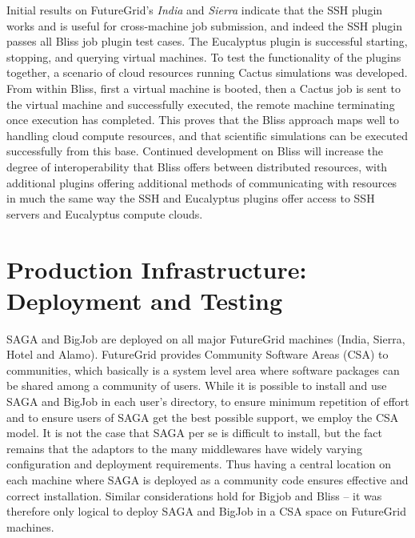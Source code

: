 \documentclass[]{paper}
\begin{document}
Initial results on FutureGrid's \textit{India} and \textit{Sierra} indicate that the
SSH plugin works and is useful for cross-machine
job submission, and indeed the SSH plugin passes all Bliss job plugin test cases.
The Eucalyptus plugin is successful starting, stopping, and querying virtual machines.
To test the functionality of the plugins together, a scenario of cloud resources running
Cactus simulations was developed.  From within Bliss, first a virtual machine is booted, 
then a Cactus job is sent to the virtual machine and successfully executed,
 the remote machine terminating
once execution has completed.  This proves that the Bliss approach maps well to handling
cloud compute resources, and that scientific simulations can be executed successfully from this
base.  Continued development on Bliss will increase the degree of interoperability that Bliss
offers between distributed resources, with additional plugins offering additional methods of
communicating with resources in much the same way the SSH and Eucalyptus plugins offer
access to SSH servers and Eucalyptus compute clouds.


\section{Production Infrastructure: Deployment and Testing}

SAGA and BigJob are deployed on all major FutureGrid machines (India,
Sierra, Hotel and Alamo).  FutureGrid provides Community Software
Areas (CSA) to communities, which basically is a system level area
where software packages can be shared among a community of users.
While it is possible to install and use SAGA and BigJob in each user's
directory, to ensure minimum repetition of effort and to ensure users
of SAGA get the best possible support, we employ the CSA model.  It is
not the case that SAGA per se is difficult to install, but the fact
remains that the adaptors to the many middlewares have widely varying
configuration and deployment requirements.  Thus having a central
location on each machine where SAGA is deployed as a community code
ensures effective and correct installation.  Similar considerations
hold for Bigjob and Bliss -- it was therefore only logical to deploy
SAGA and BigJob in a CSA space on FutureGrid machines.
\end{document}
